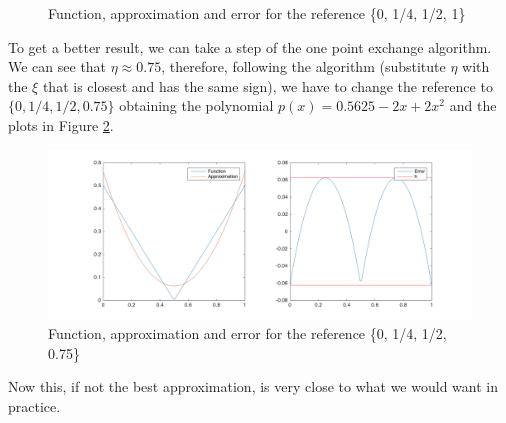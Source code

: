 \begin{solution}
\begin{figure}[h]
\caption{Function, approximation and error for the reference \{0, 1/4, 1/2, 1\}}
\label{trialapprox}
\end{figure}
To get a better result, we can take a step of the one point exchange algorithm. We can see that $\eta \approx 0.75$, therefore, following the algorithm (substitute $\eta$ with the $\xi$ that is closest and has the same sign), we have to change the reference to $\{0, 1/4, 1/2, 0.75\}$ obtaining the polynomial $p(x) = 0.5625 -2x+2x^2$ and the plots in Figure \ref{stepexchange}.
\begin{figure}[h]
\centering 
\includegraphics[scale = 0.25]{figtask2hwk4step1.png}
\caption{Function, approximation and error for the reference \{0, 1/4, 1/2, 0.75\}}
\label{stepexchange}
\end{figure}
Now this, if not the best approximation, is very close to what we would want in practice.
\end{solution}